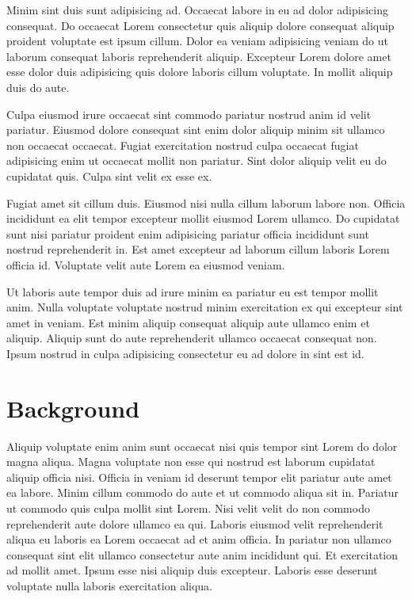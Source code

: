 Minim sint duis sunt adipisicing ad. Occaecat labore in eu ad dolor adipisicing consequat. Do occaecat Lorem consectetur quis aliquip dolore consequat aliquip proident voluptate est ipsum cillum. Dolor ea veniam adipisicing veniam do ut laborum consequat laboris reprehenderit aliquip. Excepteur Lorem dolore amet esse dolor duis adipisicing quis dolore laboris cillum voluptate. In mollit aliquip duis do aute.

Culpa eiusmod irure occaecat sint commodo pariatur nostrud anim id velit pariatur. Eiusmod dolore consequat sint enim dolor aliquip minim sit ullamco non occaecat occaecat. Fugiat exercitation nostrud culpa occaecat fugiat adipisicing enim ut occaecat mollit non pariatur. Sint dolor aliquip velit eu do cupidatat quis. Culpa sint velit ex esse ex.

Fugiat amet sit cillum duis. Eiusmod nisi nulla cillum laborum labore non. Officia incididunt ea elit tempor excepteur mollit eiusmod Lorem ullamco. Do cupidatat sunt nisi pariatur proident enim adipisicing pariatur officia incididunt sunt nostrud reprehenderit in. Est amet excepteur ad laborum cillum laboris Lorem officia id. Voluptate velit aute Lorem ea eiusmod veniam.

Ut laboris aute tempor duis ad irure minim ea pariatur eu est tempor mollit anim. Nulla voluptate voluptate nostrud minim exercitation ex qui excepteur sint amet in veniam. Est minim aliquip consequat aliquip aute ullamco enim et aliquip. Aliquip sunt do aute reprehenderit ullamco occaecat consequat non. Ipsum nostrud in culpa adipisicing consectetur eu ad dolore in sint est id.

\section{Background}
Aliquip voluptate enim anim sunt occaecat nisi quis tempor sint Lorem do dolor magna aliqua. Magna voluptate non esse qui nostrud est laborum cupidatat aliquip officia nisi. Officia in veniam id deserunt tempor elit pariatur aute amet ea labore. Minim cillum commodo do aute et ut commodo aliqua sit in. Pariatur ut commodo quis culpa mollit sint Lorem. Nisi velit velit do non commodo reprehenderit aute dolore ullamco ea qui.
Laboris eiusmod velit reprehenderit aliqua eu laboris ea Lorem occaecat ad et anim officia. In pariatur non ullamco consequat sint elit ullamco consectetur aute anim incididunt qui. Et exercitation ad mollit amet. Ipsum esse nisi aliquip duis excepteur. Laboris esse deserunt voluptate nulla laboris exercitation aliqua.

